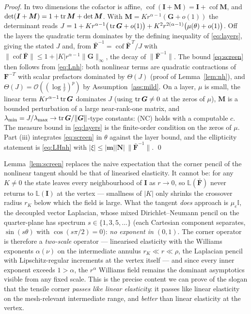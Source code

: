 \begin{proof}
    In two dimensions the cofactor is affine, $\operatorname{cof}(\bm{I}+\bm{M})=\bm{I}+\operatorname{cof}\bm{M}$, and
    $\det(\bm{I}+\bm{M})=1+\operatorname{tr}\bm{M}+\det\bm{M}$. With $\bm{M}=K r^{\alpha-1}(\bm{G}+o(1))$ the determinant reads
    $J=1+Kr^{\alpha-1}\big(\operatorname{tr}\bm{G}+o(1)\big)+K^2r^{2(\alpha-1)}\big(\mu(\theta)+o(1)\big)$. Off the layers the
    quadratic term dominates by the defining inequality of \eqref{eq:layers}, giving the stated $J$ and, from
    $\bar{\bm{F}}^{-1}=\operatorname{cof}\bar{\bm{F}}^{\,T}/J$ with
    $\|\operatorname{cof}\bar{\bm{F}}\|\le 1+|K|r^{\alpha-1}\|\bm{G}\|_\infty$, the decay of
    $\|\bar{\bm{F}}^{-1}\|$. The bound \eqref{eq:screen} then follows from \eqref{eq:Lnh}: both nonlinear terms are
    quadratic contractions of $\bm{F}^{-T}$ with scalar prefactors dominated by $\Theta(J)$
    (proof of Lemma~\ref{lem:nh}), and $\Theta(J)=\mathcal{O}((\log\tfrac1r)^p)$ by Assumption~\ref{ass:mild}. On a
    layer, $\mu$ is small, the linear term $Kr^{\alpha-1}\operatorname{tr}\bm{G}$ dominates $J$ (using $\operatorname{tr}\bm{G}\neq0$ at the zeros
    of $\mu$), $\bm{M}$ is a bounded perturbation of a large near-rank-one matrix, and
    $\lambda_{\min}=J/\lambda_{\max}\to \operatorname{tr}\bm{G}/\|\bm{G}\|$-type constants: (NC) holds with a computable $c$. The
    measure bound in \eqref{eq:layers} is the finite-order condition on the zeros of $\mu$. Part (iii) integrates
    \eqref{eq:screen} in $\theta$ against the layer bound, and the ellipticity statement is \eqref{eq:LHnh} with
    $|\xi|\le|\bm m||\bm N|\,\|\bar{\bm F}^{-1}\|$. \qed
\end{proof}

Lemma~\ref{lem:screen} replaces the naive expectation that the corner pencil of the nonlinear tangent should be that of
linearised elasticity. It cannot be: for any $K\neq0$ the state leaves every neighbourhood of $\bm{I}$ as $r\to0$, so
$\mathbb{L}(\bar{\bm{F}})$ never returns to $\mathbb{L}(\bm{I})$ at the vertex --- smallness of $|K|$ only shrinks the
crossover radius $r_K$ below which the field is large. What the tangent \emph{does} approach is $\mu_e\mathbb{I}$, the
decoupled vector Laplacian, whose mixed Dirichlet--Neumann pencil on the quarter-plane has spectrum
$s\in\{1,3,5,\dots\}$ (each Cartesian component separates, $\sin(s\theta)$ with $\cos(s\pi/2)=0$): \emph{no exponent in
$(0,1)$}. The corner operator is therefore a \emph{two-scale} operator --- linearised elasticity with the Williams
exponents $\alpha(\nu)$ on the intermediate annulus $r_K\ll r\ll\rho$, the Laplacian pencil with Lipschitz-regular
increments at the vertex itself --- and since every inner exponent exceeds $1>\alpha$, the $r^\alpha$ Williams field
remains the dominant asymptotics visible from any fixed scale. This is the precise content we can prove of the slogan
that the tensile corner \emph{passes like linear elasticity}: it passes like linear elasticity on the mesh-relevant
intermediate range, and \emph{better} than linear elasticity at the vertex.


